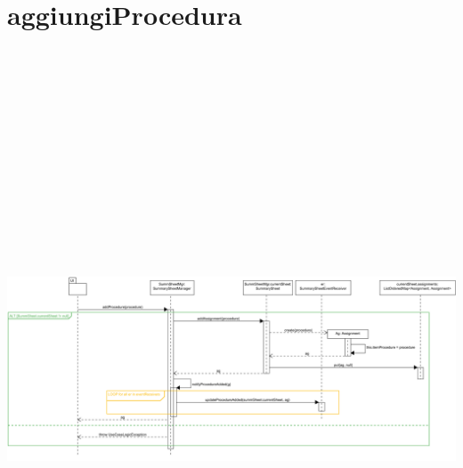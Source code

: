 \section{aggiungiProcedura}
\centering\includegraphics[max width=\textwidth, max height=190mm]{../resources/img/GCC/DSD/op2.png}

